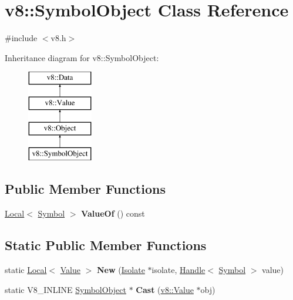 \hypertarget{classv8_1_1_symbol_object}{}\section{v8\+:\+:Symbol\+Object Class Reference}
\label{classv8_1_1_symbol_object}


{\ttfamily \#include $<$v8.\+h$>$}

Inheritance diagram for v8\+:\+:Symbol\+Object\+:\begin{figure}[H]
\begin{center}
\leavevmode
\includegraphics[height=4.000000cm]{classv8_1_1_symbol_object}
\end{center}
\end{figure}
\subsection*{Public Member Functions}
\begin{DoxyCompactItemize}
\item 
\hypertarget{classv8_1_1_symbol_object_a4a3b439c6784a4a8d9bdc5a246e12b85}{}\hyperlink{classv8_1_1_local}{Local}$<$ \hyperlink{classv8_1_1_symbol}{Symbol} $>$ {\bfseries Value\+Of} () const \label{classv8_1_1_symbol_object_a4a3b439c6784a4a8d9bdc5a246e12b85}

\end{DoxyCompactItemize}
\subsection*{Static Public Member Functions}
\begin{DoxyCompactItemize}
\item 
\hypertarget{classv8_1_1_symbol_object_a74dfdb8fdd78b14f860e3b20dc7bdc9d}{}static \hyperlink{classv8_1_1_local}{Local}$<$ \hyperlink{classv8_1_1_value}{Value} $>$ {\bfseries New} (\hyperlink{classv8_1_1_isolate}{Isolate} $\ast$isolate, \hyperlink{classv8_1_1_local}{Handle}$<$ \hyperlink{classv8_1_1_symbol}{Symbol} $>$ value)\label{classv8_1_1_symbol_object_a74dfdb8fdd78b14f860e3b20dc7bdc9d}

\item 
\hypertarget{classv8_1_1_symbol_object_aa98d7c4211bd55e347ee8169143fcec9}{}static V8\+\_\+\+I\+N\+L\+I\+N\+E \hyperlink{classv8_1_1_symbol_object}{Symbol\+Object} $\ast$ {\bfseries Cast} (\hyperlink{classv8_1_1_value}{v8\+::\+Value} $\ast$obj)\label{classv8_1_1_symbol_object_aa98d7c4211bd55e347ee8169143fcec9}

\end{DoxyCompactItemize}


